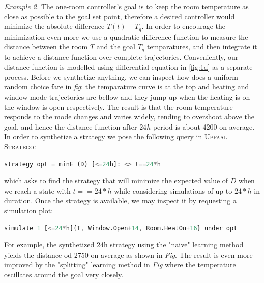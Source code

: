       
    \emph{Example 2.} The one-room controller's goal is to keep the room temperature as 
    close as possible to the goal set point, therefore a desired controller would minimize 
    the absolute difference $T(t)-T_g$. In order to encourage the minimization even more
    we use a quadratic difference function to measure the distance between the room $T$ 
    and the goal $T_g$ temparatures, and then integrate it to achieve a distance function 
    over complete trajectories. Conveniently, our distance function is modelled using 
    differential equation in \autoref{fig:1d} as a separate process. Before we synthetize anything,
    we can inspect how does a uniform random choice fare in \emph{fig}: the temparature curve 
    is at the top and heating and window  mode trajectories are bellow and they jump up
    when the heating is on the window is open respectively. The result is that the room 
    temperature responds to the mode changes and varies widely, tending to overshoot above the
    goal, and hence the distance function after $24h$ period is about 4200 on average. In order
    to synthetize a strategy we pose the following query in \textsc{Uppaal Stratego}:

    \begin{lstlisting}[language=Octave]
        strategy opt = minE (D) [<=24h]: <> t==24*h
    \end{lstlisting}

    which asks to find the strategy that will minimize the expected value of $D$ when we reach
    a state with $t == 24*h$ while considering simulations of up to $24*h$ in duration. Once
    the strategy is available, we may inspect it by requesting a simulation plot:

    \begin{lstlisting}[language=Octave]
        simulate 1 [<=24*h]{T, Window.Open+14, Room.HeatOn+16} under opt
    \end{lstlisting}

    For example, the synthetized 24h strategy using the "naive" learning method yields
    the distance od 2750 on average as shown in \emph{Fig}. The result is even more improved
    by  the "splitting" learning method in \emph{Fig} where the temperature oscillates around
    the goal very closely.    

    

    \clearpage

